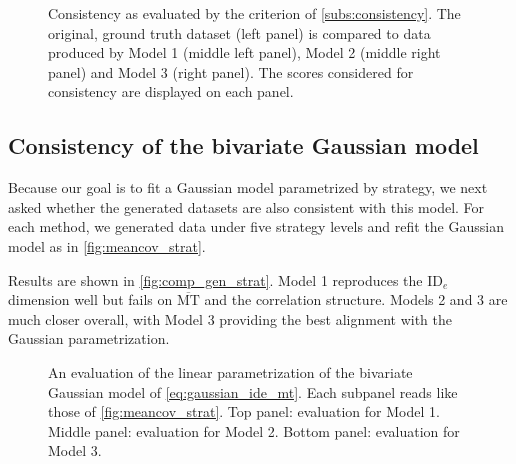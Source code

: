 \documentclass[acmlarge, manuscript,review]{acmart}
\newcommand{\mmt}{\ensuremath{\overline{\mt}}\xspace}
\newcommand{\mt}{\ensuremath{{\text{MT}}}\xspace}
\newcommand{\ide}{\ensuremath{{\text{ID}_e}}\xspace}
\begin{document}
\begin{figure}[htbp]
	\centering
	\caption{Consistency as evaluated by the criterion of \autoref{subs:consistency}. The original, ground truth dataset (left panel) is compared to data produced by Model 1 (middle left panel), Model 2 (middle right panel) and Model 3 (right panel). The scores considered for consistency are displayed on each panel.}
	\label{fig:consistency}
\end{figure}

\subsection{Consistency of the bivariate Gaussian model}
Because our goal is to fit a Gaussian model parametrized by strategy, we next asked whether the generated datasets are also consistent with this model. For each method, we generated data under five strategy levels and refit the Gaussian model as in \autoref{fig:meancov_strat}.

Results are shown in \autoref{fig:comp_gen_strat}. Model 1 reproduces the \ide dimension well but fails on \mmt and the correlation structure. Models 2 and 3 are much closer overall, with Model 3 providing the best alignment with the Gaussian parametrization.


\begin{figure}[htbp]
	\centering

	\caption{An evaluation of the linear parametrization of the bivariate Gaussian model of \autoref{eq:gaussian_ide_mt}. Each subpanel reads like those of \autoref{fig:meancov_strat}. Top panel: evaluation for Model 1. Middle panel: evaluation for Model 2. Bottom panel: evaluation for Model 3.}
	\label{fig:comp_gen_strat}
\end{figure}

\end{document}
